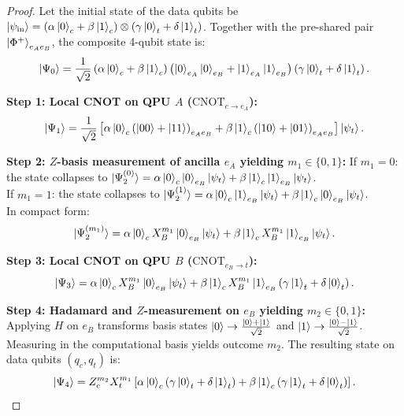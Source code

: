 \begin{proof}
Let the initial state of the data qubits be $\ket{\psi_{\text{in}}} = (\alpha\ket{0}_c + \beta\ket{1}_c) \otimes (\gamma\ket{0}_t + \delta\ket{1}_t)$. Together with the pre-shared pair $\ket{\Phi^+}_{e_A e_B}$, the composite 4-qubit state is:
\begin{equation}
    \ket{\Psi_0} = \frac{1}{\sqrt{2}} \left( \alpha\ket{0}_c + \beta\ket{1}_c \right) \left( \ket{0}_{e_A}\ket{0}_{e_B} + \ket{1}_{e_A}\ket{1}_{e_B} \right) \left( \gamma\ket{0}_t + \delta\ket{1}_t \right).
\end{equation}

\textbf{Step 1: Local CNOT on QPU $A$ ($\text{CNOT}_{c \to e_A}$):}
\begin{equation}
    \ket{\Psi_1} = \frac{1}{\sqrt{2}} \left[ \alpha\ket{0}_c \left( \ket{00} + \ket{11} \right)_{e_A e_B} + \beta\ket{1}_c \left( \ket{10} + \ket{01} \right)_{e_A e_B} \right] \ket{\psi_t}.
\end{equation}

\textbf{Step 2: $Z$-basis measurement of ancilla $e_A$ yielding $m_1 \in \{0, 1\}$:}
If $m_1 = 0$: the state collapses to $\ket{\Psi_2^{(0)}} = \alpha\ket{0}_c\ket{0}_{e_B}\ket{\psi_t} + \beta\ket{1}_c\ket{1}_{e_B}\ket{\psi_t}$.\\
If $m_1 = 1$: the state collapses to $\ket{\Psi_2^{(1)}} = \alpha\ket{0}_c\ket{1}_{e_B}\ket{\psi_t} + \beta\ket{1}_c\ket{0}_{e_B}\ket{\psi_t}$.\\
In compact form:
\begin{equation}
    \ket{\Psi_2^{(m_1)}} = \alpha\ket{0}_c X_B^{m_1}\ket{0}_{e_B}\ket{\psi_t} + \beta\ket{1}_c X_B^{m_1}\ket{1}_{e_B}\ket{\psi_t}.
\end{equation}

\textbf{Step 3: Local CNOT on QPU $B$ ($\text{CNOT}_{e_B \to t}$):}
\begin{equation}
    \ket{\Psi_3} = \alpha\ket{0}_c X_B^{m_1}\ket{0}_{e_B}\ket{\psi_t} + \beta\ket{1}_c X_B^{m_1}\ket{1}_{e_B} \left( \gamma\ket{1}_t + \delta\ket{0}_t \right).
\end{equation}

\textbf{Step 4: Hadamard and $Z$-measurement on $e_B$ yielding $m_2 \in \{0, 1\}$:}
Applying $H$ on $e_B$ transforms basis states $\ket{0} \to \frac{\ket{0}+\ket{1}}{\sqrt{2}}$ and $\ket{1} \to \frac{\ket{0}-\ket{1}}{\sqrt{2}}$. Measuring in the computational basis yields outcome $m_2$. The resulting state on data qubits $(q_c, q_t)$ is:
\begin{equation}
    \ket{\Psi_4} = Z_c^{m_2} X_t^{m_1} \left[ \alpha\ket{0}_c (\gamma\ket{0}_t + \delta\ket{1}_t) + \beta\ket{1}_c (\gamma\ket{1}_t + \delta\ket{0}_t) \right].
\end{equation}


\end{proof}
